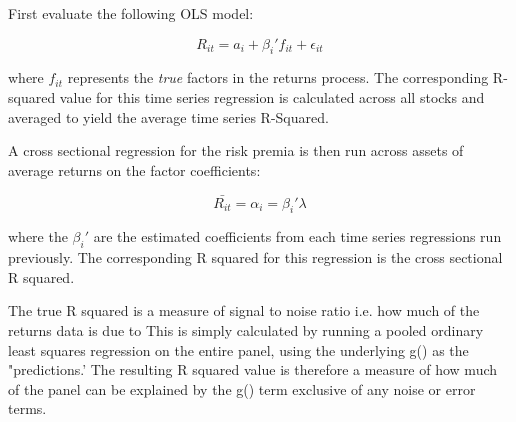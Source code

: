 \documentclass[a4paper, table]{article}
\begin{document}
First evaluate the following OLS model:

\begin{equation}
	R_{it} = a_i + \beta_i' f_{it} + \epsilon_{it} 
\end{equation}

where $f_{it}$ represents the \textit{true} factors in the returns process. The corresponding R-squared value for this time series regression is calculated across all stocks and averaged to yield the average time series R-Squared. 

A cross sectional regression for the risk premia is then run across assets of average returns on the factor coefficients:

\begin{equation}
	\bar{R_{it}} = \alpha_i = \beta_i' \lambda
\end{equation}

where the $\beta_i'$ are the estimated coefficients from each time series regressions run previously. The corresponding R squared for this regression is the cross sectional R squared.

The true R squared is a measure of signal to noise ratio i.e. how much of the returns data is due to 
This is simply calculated by running a pooled ordinary least squares regression on the entire panel, using the underlying g() as the "predictions.' The resulting R squared value is therefore a measure of how much of the panel can be explained by the g() term exclusive of any noise or error terms.




\end{document}

